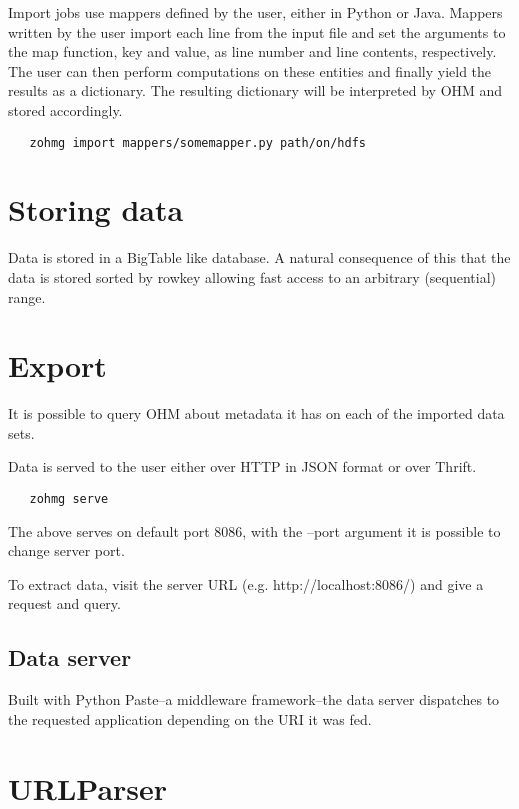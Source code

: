\documentclass[a4paper,10pt]{book}
\begin{document}
Import jobs use mappers defined by the user, either in Python or Java.
Mappers written by the user import each line from the input file and set
the arguments to the map function, key and value, as line number and line
contents, respectively. The user can then perform computations on these
entities and finally yield the results as a dictionary. The resulting
dictionary will be interpreted by OHM and stored accordingly.

\begin{verbatim}
   zohmg import mappers/somemapper.py path/on/hdfs
\end{verbatim}


\section{Storing data}

Data is stored in a BigTable like database. A natural consequence of this
that the data is stored sorted by rowkey allowing fast access to an
arbitrary (sequential) range.



\section{Export}

It is possible to query OHM about metadata it has on each of the imported
data sets.

Data is served to the user either over HTTP in JSON format or over Thrift.
\cite{thrift}

\begin{verbatim}
   zohmg serve
\end{verbatim}

\noindent The above serves on default port 8086, with the --port argument
it is possible to change server port.

To extract data, visit the server URL (e.g. http://localhost:8086/) and
give a request and query.


\subsection{Data server}

Built with Python Paste--a middleware framework--the data server dispatches
to the requested application depending on the URI it was fed.



\section{URLParser}
\end{document}
